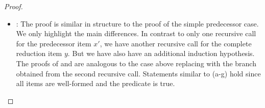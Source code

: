 \begin{isabellebody}
\begin{isamarkuptext}
\begin{proof}
\begin{itemize}
    (1) by definition.
    (2) by (). 
    (3) by (g) and the definition of .
    (4) by (e).
    (5) by (f,g).

  \item {}:
    The proof is similar in structure to the proof of the simple predecessor case. We only highlight
    the main differences. In contrast to only one recursive call for the predecessor item $x'$, we
    have another recursive call for the complete reduction item $y$. But we have also have an additional
    induction hypothesis. The proofs of  and 
    are analogous to the case above replacing  with the branch obtained from
    the second recursive call. Statements similar to (a-g) hold since all items are well-formed and
    the predicate  is true.

\end{itemize}


\end{proof}
\end{isamarkuptext}
\end{isabellebody}
